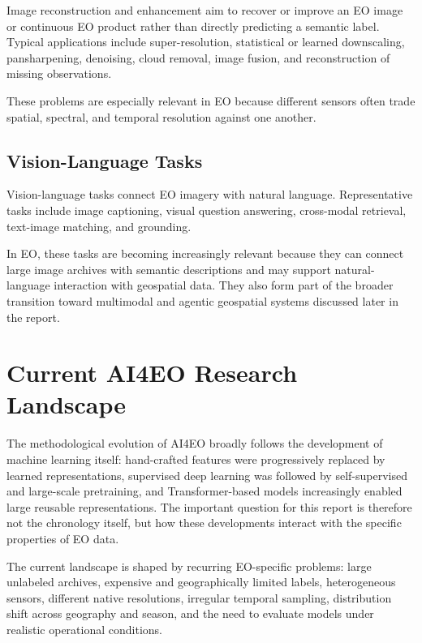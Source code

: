 \documentclass[11pt,a4paper]{article}
\begin{document}
Image reconstruction and enhancement aim to recover or improve an EO
image or continuous EO product rather than directly predicting a
semantic label. Typical applications include super-resolution,
statistical or learned downscaling, pansharpening, denoising, cloud
removal, image fusion, and reconstruction of missing observations.

These problems are especially relevant in EO because different sensors
often trade spatial, spectral, and temporal resolution against one
another.

\subsection{Vision-Language Tasks}

Vision-language tasks connect EO imagery with natural language.
Representative tasks include image captioning, visual question answering,
cross-modal retrieval, text-image matching, and grounding.

In EO, these tasks are becoming increasingly relevant because they can
connect large image archives with semantic descriptions and may support
natural-language interaction with geospatial data. They also form part
of the broader transition toward multimodal and agentic geospatial
systems discussed later in the report.

\section{Current AI4EO Research Landscape}

The methodological evolution of AI4EO broadly follows the development of
machine learning itself: hand-crafted features were progressively
replaced by learned representations, supervised deep learning was
followed by self-supervised and large-scale pretraining, and
Transformer-based models increasingly enabled large reusable
representations. The important question for this report is therefore not
the chronology itself, but how these developments interact with the
specific properties of EO data.

The current landscape is shaped by recurring EO-specific problems:
large unlabeled archives, expensive and geographically limited labels,
heterogeneous sensors, different native resolutions, irregular temporal
sampling, distribution shift across geography and season, and the need
to evaluate models under realistic operational conditions.
\end{document}

